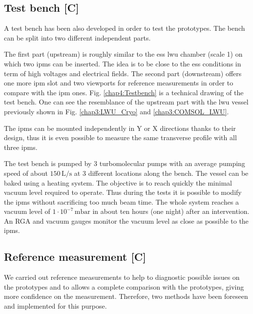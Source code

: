 \begin{refsection}

  

  \subsection{Test bench [C]}
  A test bench has been also developed in order to test the prototypes. The bench can be split into two different independent parts.

  The first part (upstream) is roughly similar to the \acrshort{ess} \acrshort{lwu} chamber (scale 1) on which two \acrshort{ipm}s can be inserted. The idea is to be close to the \acrshort{ess} conditions in term of high voltages and electrical fields. The second part (downstream) offers one more \acrshort{ipm} slot and two viewports for reference measurements in order to compare with the \acrshort{ipm} ones. Fig. \ref{chap4:Testbench} is a technical drawing of the test bench. One can see the resemblance of the upstream part with the \acrshort{lwu} vessel previously shown in Fig. \ref{chap3:LWU_Cryo} and \ref{chap3:COMSOL_LWU}.


  The \acrshort{ipm}s can be mounted independently in Y or X directions thanks to their design, thus it is even possible to measure the same transverse profile with all three \acrshort{ipm}s.

  

  The test bench is pumped by 3 turbomolecular pumps with an average pumping speed of about $150\,\mathrm{L/s}$ at 3 different locations along the bench. The vessel can be baked using a heating system. The objective is to reach quickly the minimal vacuum level required to operate. Thus during the tests it is possible to modify the \acrshort{ipm}s without sacrificing too much beam time. The whole system reaches a vacuum level of $1\cdot 10^{-7}\,\mathrm{mbar}$ in about ten hours (one night) after an intervention. An RGA and vacuum gauges monitor the vacuum level as close as possible to the \acrshort{ipm}s.

  \subsection{Reference measurement [C]}
  \label{chap4:sec:ref}
  We carried out reference measurements to help to diagnostic possible issues on the prototypes and to allows a complete comparison with the prototypes, giving more confidence on the measurement. Therefore, two methods have been foreseen and implemented for this purpose.


\end{refsection}

